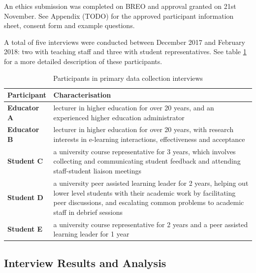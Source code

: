 An ethics submission was completed on BREO and approval granted on 21st November.
See Appendix (TODO) for the approved participant information sheet, consent form and example questions.

A total of five interviews were conducted between December 2017 and February 2018:
two with teaching staff and three with student representatives. See table
\ref{table:participants-req} for a more detailed description of these participants.

\begin{table}[!h]
	\caption{Participants in primary data collection interviews}
	\centering
	\label{table:participants-req}
	\begin{tabularx}{\textwidth}{>{\bfseries}lX}
		Participant & Characterisation                                                                    \\
		\toprule
		Educator A  & lecturer in higher education for over 20 years, and an experienced higher education
		administrator                                                                                     \\\midrule
		Educator B  & lecturer in higher education for over 20 years, with research interests
		in e-learning interactions, effectiveness and acceptance                                          \\\midrule
		Student C   & a university course representative for 3 years, which involves collecting and
		communicating student feedback and attending staff-student liaison meetings                       \\\midrule
		Student D   & a university peer assisted learning leader for 2 years, helping out lower level
		students with their academic work by facilitating peer discussions, and escalating common problems
		to academic staff in debrief sessions                                                             \\\midrule
		Student E   & a university course representative for 2 years and a peer assisted learning leader
		for 1 year                                                                                        \\\bottomrule
	\end{tabularx}
\end{table}

\subsection{Interview Results and Analysis}


